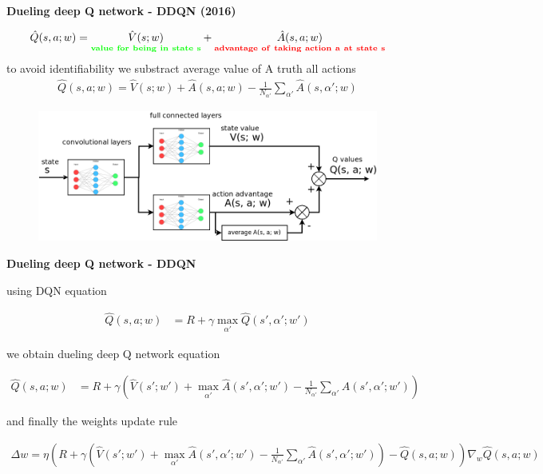 \documentclass[xcolor=dvipsnames]{beamer}
\begin{document}
\begin{frame}{\bf Dueling deep Q network - DDQN (2016)}

\begin{align*}
  \hat{Q}(s, a; w) = \underset{\bf \color{green} value\ for\ being\ in\ state\ s}{\hat{V}(s; w)} + \underset{\bf \color{red} advantage\ of\ taking\ action\ a\ at\ state\ s}{\hat{A}(s, a; w)}
\end{align*}
to avoid identifiability we substract average value of A truth all actions
\begin{align*}
  \hat{Q}(s, a; w) = \hat{V}(s; w) + \hat{A}(s, a; w) - \frac{1}{N_{\alpha'}} \sum_{\alpha'} \hat{A}(s, \alpha'; w)
\end{align*}

\begin{figure}[!htb]
  \centering
  \includegraphics[scale=0.3]{../../diagrams/dueling_dqn_0.png}
  \label{img:ddqn_principle}
\end{figure}

\end{frame}

\begin{frame}{\bf Dueling deep Q network - DDQN}

using DQN equation

{\footnotesize
\begin{align*}
  \hat{Q}(s, a; w) &= R + \gamma \max \limits_{\alpha'} \hat{Q}(s', \alpha'; w')
\end{align*}
}

we obtain dueling deep Q network equation

{\footnotesize
\begin{align*}
  \hat{Q}(s, a; w)&= R + \gamma \left( \hat{V}(s'; w') + \max \limits_{\alpha'} \hat{A}(s', \alpha'; w') - \frac{1}{N_{\alpha'}} \sum_{\alpha'} \hat{A}(s', \alpha'; w') \right)
\end{align*}
}

and finally the weights update rule

{\tiny

\begin{align*}
  \Delta w = \eta \left( R + \gamma \left( \hat{V}(s'; w') + \max \limits_{\alpha'} \hat{A}(s', \alpha'; w') - \frac{1}{N_{\alpha'}} \sum_{\alpha'} \hat{A}(s', \alpha'; w') \right) - \hat{Q}(s, a; w)\right) \nabla_w \hat{Q}(s, a; w)
\end{align*}
}

\end{frame}
\end{document}
